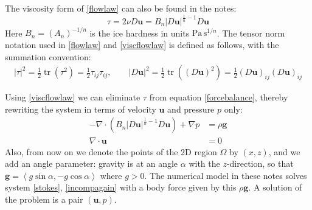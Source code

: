 \documentclass[letterpaper,final,12pt,reqno]{amsart}
\newcommand{\Div}{\nabla\cdot}
\newcommand{\trace}{\operatorname{tr}}
\newcommand{\bg}{\mathbf{g}}
\newcommand{\bu}{\mathbf{u}}
\begin{document}
The viscosity form of \eqref{flowlaw} can also be found in the notes:
\begin{equation}
\tau = 2\nu D\bu = B_n |D\bu|^{\frac{1}{n} - 1} D\bu  \label{viscflowlaw}
\end{equation}
Here $B_n = (A_n)^{-1/n}$ is the ice hardness in units $\text{Pa}\,\text{s}^{1/n}$.  The tensor norm notation used in \eqref{flowlaw}  and \eqref{viscflowlaw} is defined as follows, with the summation convention:
\begin{align*}
|\tau|^2 = \frac{1}{2} \trace\left(\tau^2\right) = \frac{1}{2} \tau_{ij} \tau_{ij}, \qquad |D\bu|^2 = \frac{1}{2} \trace\left((D\bu)^2\right) = \frac{1}{2} (D\bu)_{ij} (D\bu)_{ij}
\end{align*}

Using \eqref{viscflowlaw} we can eliminate $\tau$ from equation \eqref{forcebalance}, thereby rewriting the system in terms of velocity $\bu$ and pressure $p$ only:
\begin{align}
- \nabla \cdot \left(B_n |D\bu|^{\frac{1}{n} - 1} D\bu\right) + \nabla p &= \rho \mathbf{g} \label{stokes} \\
\Div \bu &= 0 \label{incompagain}
\end{align}
Also, from now on we denote the points of the 2D region $\Omega$ by $(x,z)$, and we add an angle parameter: gravity is at an angle $\alpha$ with the $z$-direction, so that $\bg = \left<g\sin\alpha,-g\cos\alpha\right>$ where $g>0$.  The numerical model in these notes solves system \eqref{stokes}, \eqref{incompagain} with a body force given by this $\rho \bg$.  A solution of the problem is a pair $(\bu,p)$.
\end{document}
